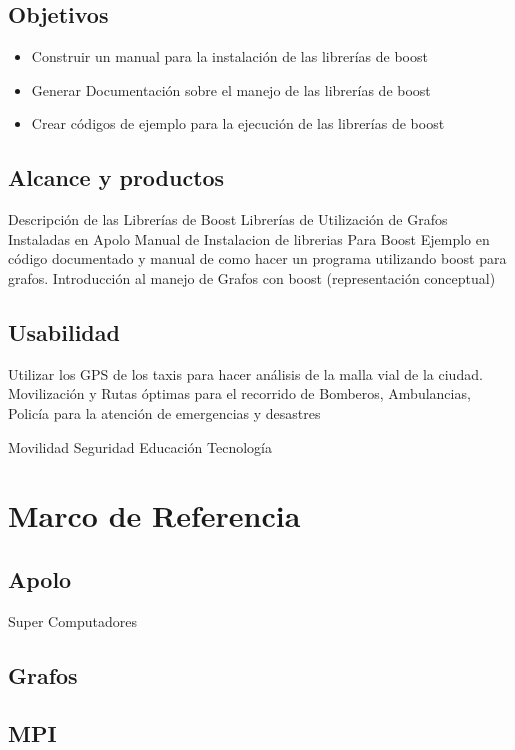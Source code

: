 \documentclass[twoside,letterpaper,12pt]{report}
\begin{document}
\section{Objetivos}

\begin{itemize}
	\item Construir un manual para la instalación de las librerías de boost
	\item Generar Documentación sobre el manejo de las librerías de boost
	\item Crear códigos de ejemplo para la ejecución de las librerías de boost	
\end{itemize}



\section{Alcance y productos}

Descripción de las Librerías de Boost
Librerías de Utilización de Grafos Instaladas en Apolo
Manual de Instalacion de librerias Para Boost
Ejemplo en código documentado y manual de como hacer un programa utilizando boost para grafos.
Introducción al manejo de Grafos con boost (representación conceptual)

\section{Usabilidad}

Utilizar los GPS de los taxis para hacer análisis de la malla vial de la ciudad. 
Movilización y Rutas óptimas para el recorrido de Bomberos, Ambulancias, Policía para la atención de emergencias y desastres


Movilidad
Seguridad
Educación 
Tecnología

\chapter{Marco de Referencia}
\label{ChapRef}

\section{Apolo} Super Computadores
\section{Grafos}
\section{MPI}
\end{document}
